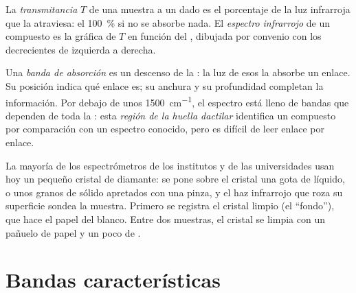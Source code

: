 \begin{definition}\label{def:g11:infrared:spectrum}
La \emph{transmitancia} $T$ de una muestra a un
 dado es el porcentaje de la luz infrarroja que la
atraviesa: el \qty{100}{\percent} si no se absorbe nada. El
\emph{espectro infrarrojo} de un compuesto
es la gráfica de $T$ en función del , dibujada por
convenio con los  decrecientes de izquierda a derecha.
\end{definition}

\begin{definition}\label{def:g11:infrared:band}
Una \emph{banda de absorción} es un descenso
de la : la luz de esos  la absorbe un
enlace. Su posición indica qué enlace es; su anchura y su profundidad
completan la información. Por debajo de unos \qty{1500}{cm^{-1}}, el
espectro está lleno de bandas que dependen de toda la : esta
\emph{región de la huella dactilar}
identifica un compuesto por comparación con un espectro conocido, pero
es difícil de leer enlace por enlace.
\end{definition}

\begin{inthelab}
La mayoría de los espectrómetros de los institutos y de las
universidades usan hoy un pequeño cristal de diamante: se pone sobre el
cristal una gota de líquido, o unos granos de sólido apretados con una
pinza, y el haz infrarrojo que roza su superficie sondea la muestra.
Primero se registra el cristal limpio (el ``fondo''), que hace el papel
del blanco. Entre dos muestras, el cristal se limpia con un pañuelo de
papel y un poco de .
\end{inthelab}

\section{Bandas características}

